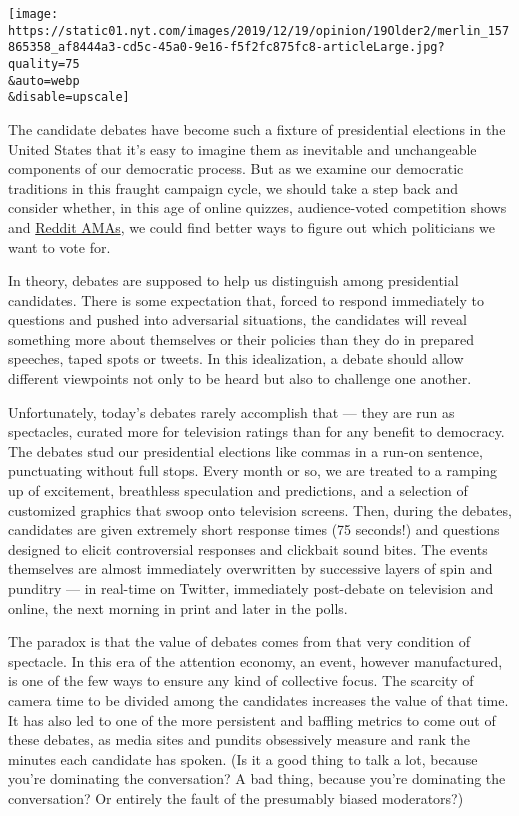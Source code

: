 \texttt{[image: https://static01.nyt.com/images/2019/12/19/opinion/19Older2/merlin\_157865358\_af8444a3-cd5c-45a0-9e16-f5f2fc875fc8-articleLarge.jpg?quality=75\\\&auto=webp\\\&disable=upscale]}

The candidate debates have become such a fixture of presidential
elections in the United States that it's easy to imagine them as
inevitable and unchangeable components of our democratic process. But as
we examine our democratic traditions in this fraught campaign cycle, we
should take a step back and consider whether, in this age of online
quizzes, audience-voted competition shows and
\href{https://www.reddit.com/r/IAmA/}{Reddit AMAs}, we could find better
ways to figure out which politicians we want to vote for.

In theory, debates are supposed to help us distinguish among
presidential candidates. There is some expectation that, forced to
respond immediately to questions and pushed into adversarial situations,
the candidates will reveal something more about themselves or their
policies than they do in prepared speeches, taped spots or tweets. In
this idealization, a debate should allow different viewpoints not only
to be heard but also to challenge one another.

Unfortunately, today's debates rarely accomplish that --- they are run
as spectacles, curated more for television ratings than for any benefit
to democracy. The debates stud our presidential elections like commas in
a run-on sentence, punctuating without full stops. Every month or so, we
are treated to a ramping up of excitement, breathless speculation and
predictions, and a selection of customized graphics that swoop onto
television screens. Then, during the debates, candidates are given
extremely short response times (75 seconds!) and questions designed to
elicit controversial responses and clickbait sound bites. The events
themselves are almost immediately overwritten by successive layers of
spin and punditry --- in real-time on Twitter, immediately post-debate
on television and online, the next morning in print and later in the
polls.

The paradox is that the value of debates comes from that very condition
of spectacle. In this era of the attention economy, an event, however
manufactured, is one of the few ways to ensure any kind of collective
focus. The scarcity of camera time to be divided among the candidates
increases the value of that time. It has also led to one of the more
persistent and baffling metrics to come out of these debates, as media
sites and pundits obsessively measure and rank the minutes each
candidate has spoken. (Is it a good thing to talk a lot, because you're
dominating the conversation? A bad thing, because you're dominating the
conversation? Or entirely the fault of the presumably biased
moderators?)

